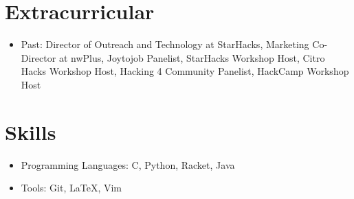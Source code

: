 \documentclass[a4paper,11pt]{article}
\newcommand{\resumeItem}[1]{
	\item\small{
		{#1 \vspace{-2pt}}
	}
}
\newcommand{\resumeItemListStart}{\begin{itemize}\OpenSansRegular}
\newcommand{\resumeItemListEnd}{\end{itemize}\vspace{-5pt}}
\begin{document}
\section{Extracurricular}
\resumeItemListStart
\resumeItem{Past:
	Director of Outreach and Technology at StarHacks,
	Marketing Co-Director at nwPlus,
	Joytojob Panelist,
	StarHacks Workshop Host,
	Citro Hacks Workshop Host,
	Hacking 4 Community Panelist,
	HackCamp Workshop Host
}
\resumeItemListEnd



\section{Skills}
\resumeItemListStart
\resumeItem{Programming Languages: C, Python, Racket, Java}
\resumeItem{Tools: Git, LaTeX, Vim}
\resumeItemListEnd

\end{document}
